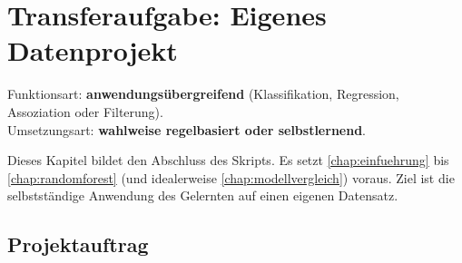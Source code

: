 \chapter{Transferaufgabe: Eigenes Datenprojekt}
\label{chap:transfer}

\begin{myremark}
Funktionsart: \textbf{anwendungsübergreifend} (Klassifikation, Regression, Assoziation oder Filterung). \\
Umsetzungsart: \textbf{wahlweise regelbasiert oder selbstlernend}.
\end{myremark}

\begin{myremark}
Dieses Kapitel bildet den Abschluss des Skripts.
Es setzt \cref{chap:einfuehrung} bis \cref{chap:randomforest} (und idealerweise \cref{chap:modellvergleich}) voraus.
Ziel ist die selbstständige Anwendung des Gelernten auf einen eigenen Datensatz.
\end{myremark}

\section{Projektauftrag}

